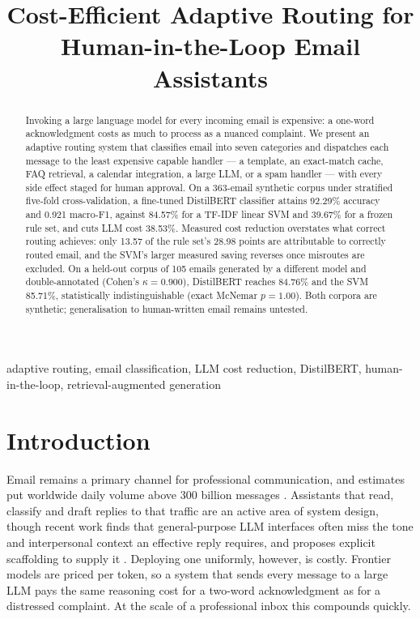 \documentclass[conference]{IEEEtran}
\begin{document}
\title{Cost-Efficient Adaptive Routing for Human-in-the-Loop Email Assistants}

\author{
}

\maketitle

\begin{abstract}
Invoking a large language model for every incoming email is expensive: a one-word acknowledgment costs as much to process as a nuanced complaint. We present an adaptive routing system that classifies email into seven categories and dispatches each message to the least expensive capable handler --- a template, an exact-match cache, FAQ retrieval, a calendar integration, a large LLM, or a spam handler --- with every side effect staged for human approval. On a 363-email synthetic corpus under stratified five-fold cross-validation, a fine-tuned DistilBERT classifier attains 92.29\% accuracy and 0.921 macro-F1, against 84.57\% for a TF-IDF linear SVM and 39.67\% for a frozen rule set, and cuts LLM cost 38.53\%. Measured cost reduction overstates what correct routing achieves: only 13.57 of the rule set's 28.98 points are attributable to correctly routed email, and the SVM's larger measured saving reverses once misroutes are excluded. On a held-out corpus of 105 emails generated by a different model and double-annotated (Cohen's $\kappa=0.900$), DistilBERT reaches 84.76\% and the SVM 85.71\%, statistically indistinguishable (exact McNemar $p=1.00$). Both corpora are synthetic; generalisation to human-written email remains untested.
\end{abstract}

\begin{IEEEkeywords}
adaptive routing, email classification, LLM cost reduction, DistilBERT, human-in-the-loop, retrieval-augmented generation
\end{IEEEkeywords}

\section{Introduction}
Email remains a primary channel for professional communication, and estimates put worldwide daily volume above 300 billion messages \cite{b1}. Assistants that read, classify and draft replies to that traffic are an active area of system design, though recent work finds that general-purpose LLM interfaces often miss the tone and interpersonal context an effective reply requires, and proposes explicit scaffolding to supply it \cite{b2}. Deploying one uniformly, however, is costly. Frontier models are priced per token, so a system that sends every message to a large LLM pays the same reasoning cost for a two-word acknowledgment as for a distressed complaint. At the scale of a professional inbox this compounds quickly.
\end{document}
